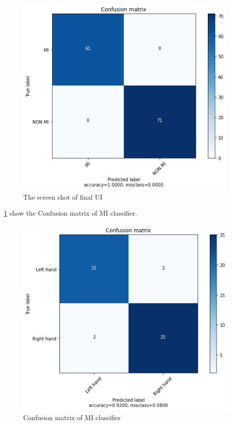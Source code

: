 \documentclass[12pt,a4paper]{report}
\begin{document}
	\begin{figure}[h]
	\centering 
	
	\includegraphics[height =4in]{cf1.png}
	\caption{ The screen shot of final UI}
	\label{Fig mi_nomi}
	\end{figure}
\justify \ref{Fig mi_nomi} show the Confusion matrix of MI classifier.	
		\begin{figure}[h]
		\centering 
		
		\includegraphics[height =4in]{cf2.png}
		\caption{ Confusion matrix of MI classifier}
		\label{Fig MI}
	\end{figure}
	
\end{document}
